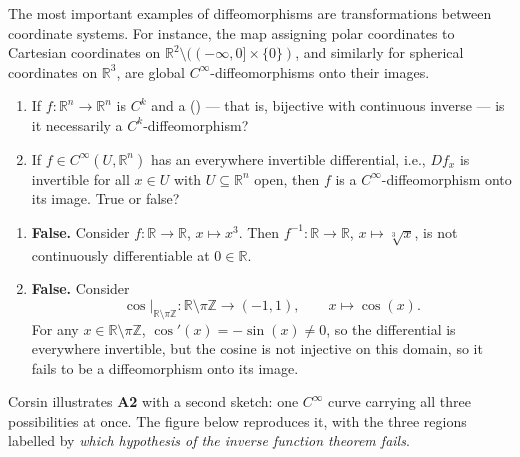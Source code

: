 \begin{example}
\label{ex:polar_spherical_coordinates}
The most important examples of diffeomorphisms are transformations between coordinate systems. For instance, the map assigning polar coordinates to Cartesian coordinates on $\mathbb{R}^2 \setminus ( (-\infty, 0] \times \{0\} )$, and similarly for spherical coordinates on $\mathbb{R}^3$, are global $C^\infty$-diffeomorphisms onto their images.
\end{example}

\begin{question}
\begin{enumerate}[label=\textbf{Q\arabic*.}]
  \item If $f : \mathbb{R}^n \to \mathbb{R}^n$ is $C^k$ and a 
    () --- that is, bijective with continuous inverse --- is it
    necessarily a $C^k$-diffeomorphism?
  \item If $f \in C^\infty(U,\mathbb{R}^n)$ has an everywhere invertible differential, i.e.,
    $Df_x$ is invertible for all $x \in U$ with $U \subseteq \mathbb{R}^n$ open, then $f$ is a
    $C^\infty$-diffeomorphism onto its image. True or false?
\end{enumerate}
\end{question}

\begin{answer}
\begin{enumerate}[label=\textbf{A\arabic*.}]
  \item \textbf{False.} Consider $f : \mathbb{R} \to \mathbb{R}$, $x \mapsto x^3$. Then
    $f^{-1} : \mathbb{R} \to \mathbb{R}$, $x \mapsto \sqrt[3]{x}$, is not continuously
    differentiable at $0 \in \mathbb{R}$.
  \item \textbf{False.} Consider
    \[\cos|_{\mathbb{R}\setminus\pi\mathbb{Z}} : \mathbb{R}\setminus\pi\mathbb{Z} \to (-1,1), \qquad x \mapsto \cos(x).\]
    For any $x \in \mathbb{R}\setminus\pi\mathbb{Z}$, $\cos'(x) = -\sin(x) \neq 0$, so the
    differential is everywhere invertible, but the cosine is not injective on this domain, so it
    fails to be a diffeomorphism onto its image.
\end{enumerate}
\end{answer}

\begin{ainote}
Corsin illustrates \textbf{A2} with a second sketch: one $C^\infty$ curve carrying all three
possibilities at once. The figure below reproduces it, with the three regions labelled by
\emph{which hypothesis of the inverse function theorem fails}.
\end{ainote}


